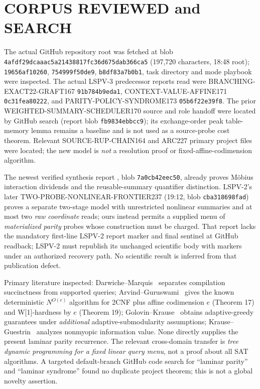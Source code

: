\documentclass[11pt]{article}
\begin{document}
\section{CORPUS REVIEWED and SEARCH}
The actual GitHub repository  root  was fetched at blob \texttt{4afdf29dcaaac5a21438817fc36d675dab366ca5} (197,720 characters, 18:48 root);  \texttt{19656af10260},  \texttt{754999f50de9},  \texttt{b8df83a7b0b1}, task directory and mode playbook were inspected. The actual LSPV-3 predecessor reports read were BRANCHING-EXACT22-GRAFT167 \texttt{91b784b9eda1}, CONTEXT-VALUE-AFFINE171 \texttt{0c31fea80222}, and PARITY-POLICY-SYNDROME173 \texttt{05b6f22e39f8}. The prior WEIGHTED-SUMMARY-SCHEDULER170 source and role handoff were located by GitHub search (report blob \texttt{fb9834ebbcc9}); its exchange-order peak table-memory lemma remains a baseline and is not used as a source-probe cost theorem. Relevant SOURCE-RUP-CHAIN164 and ARC227 primary project files were located; the new model is \emph{not} a resolution proof or fixed-affine-codimension algorithm.

The newest verified synthesis report , blob \texttt{7a0cb42eec50}, already proves M\"obius interaction dividends and the reusable-summary quantifier distinction. LSPV-2's later TWO-PROBE-NONLINEAR-FRONTIER237 (19:12, blob \texttt{cba318698fad}) proves a separate two-stage model with unrestricted nonlinear summaries and at most two \emph{raw coordinate} reads; ours instead permits a supplied menu of \emph{materialized parity} probes whose construction must be charged. That report lacks the mandatory first-line LSPV-2 report marker and final sentinel at GitHub readback; LSPV-2 must republish its unchanged scientific body with markers under an authorized recovery path. No scientific result is inferred from that publication defect.

Primary literature inspected: Darwiche--Marquis~\cite{dm} separates compilation succinctness from supported queries; Arvind--Guruswami~\cite{ag} gives the known deterministic $N^{O(e)}$ algorithm for 2CNF plus affine codimension $e$ (Theorem 17) and W[1]-hardness by $e$ (Theorem 19); Golovin--Krause~\cite{gk} obtains adaptive-greedy guarantees under \emph{additional} adaptive-submodularity assumptions; Krause--Guestrin~\cite{kg} analyzes nonmyopic information value. None directly supplies the present laminar parity recurrence. The relevant cross-domain transfer is \emph{tree dynamic programming for a fixed linear query menu}, not a proof about all SAT algorithms. A targeted default-branch GitHub code search for ``laminar parity'' and ``laminar syndrome'' found no duplicate project theorem; this is not a global novelty assertion.
\end{document}
